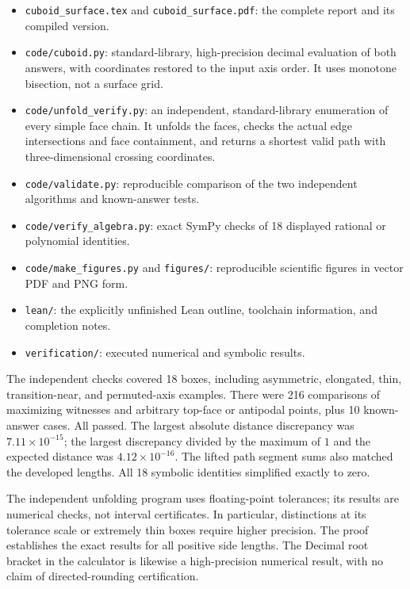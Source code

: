 \documentclass[11pt]{article}
\theoremstyle{definition}
\begin{document}
\begin{itemize}
\item \texttt{cuboid\_surface.tex} and \texttt{cuboid\_surface.pdf}:
the complete report and its compiled version.
\item \texttt{code/cuboid.py}: standard-library, high-precision
decimal evaluation of both answers, with coordinates restored to the
input axis order. It uses monotone bisection, not a surface grid.
\item \texttt{code/unfold\_verify.py}: an independent, standard-library
enumeration of every simple face chain. It unfolds the faces, checks
the actual edge intersections and face containment, and returns a
shortest valid path with three-dimensional crossing coordinates.
\item \texttt{code/validate.py}: reproducible comparison of the two
independent algorithms and known-answer tests.
\item \texttt{code/verify\_algebra.py}: exact SymPy checks of
18 displayed rational or polynomial identities.
\item \texttt{code/make\_figures.py} and \texttt{figures/}: reproducible
scientific figures in vector PDF and PNG form.
\item \texttt{lean/}: the explicitly unfinished Lean outline,
toolchain information, and completion notes.
\item \texttt{verification/}: executed numerical and symbolic results.
\end{itemize}

The independent checks covered 18 boxes, including asymmetric,
elongated, thin, transition-near, and permuted-axis examples.
There were 216 comparisons of maximizing witnesses and arbitrary
top-face or antipodal points, plus 10 known-answer cases.
All passed. The largest absolute distance discrepancy was
\(7.11\times10^{-15}\); the largest discrepancy divided by the
maximum of \(1\) and the expected distance was
\(4.12\times10^{-16}\).
The lifted path segment sums also matched the developed lengths.
All 18 symbolic identities simplified exactly to zero.

The independent unfolding program uses floating-point tolerances;
its results are numerical checks, not interval certificates.
In particular, distinctions at its tolerance scale or extremely thin
boxes require higher precision. The proof establishes the exact results
for all positive side lengths. The Decimal root bracket in the
calculator is likewise a high-precision numerical result, with no
claim of directed-rounding certification.
\end{document}
